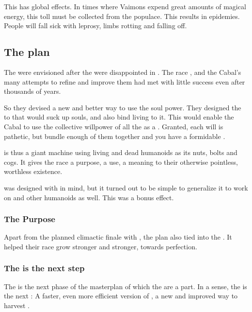 This has global effects. 
In times where Vaimons expend great amounts of magical energy, this toll must be collected from the populace. 
This results in epidemies. 
People will fall sick with leprosy, limbs rotting and falling off. 









\subsection{The \Iquin plan}
The \sephiroth{} were envisioned after the  were disappointed in \humans. 
The \human{} race , and the Cabal's many attempts to refine and improve them had met with little success even after thousands of years. 

So they devised a new and better way to use the \pps{\humans} soul power. 
They designed the \sephiroth{} to  that would suck up \human{} souls, and also bind living \humans{} to it. 
This would enable the Cabal to use the collective willpower of all the \humans{} as a \vertex. 
Granted, each \human{} will is pathetic, but bundle enough of them together and you have a formidable \vertex. 

\Iquin{} is thus a giant machine using living and dead humanoids as its nuts, bolts and cogs. 
It gives the \human{} race a purpose, a use, a meaning to their otherwise pointless, worthless existence. 

\Iquin{} was designed with \humans{} in mind, but it turned out to be simple to generalize it to work on \scathae{} and other humanoids as well. 
This was a bonus effect. 





\subsubsection{The \Resphan{} Purpose}
Apart from the planned climactic finale with , the \iquin{} plan also tied into the . 
It helped their race grow stronger and stronger, towards perfection. 





\subsubsection{The \Morbus is the next step}
The  is the next phase of the masterplan of which the \sephiroth{} are a part. 
In a sense, the \Morbus{} is the next : 
A faster, even more efficient version of \iquin, a new and improved way to harvest \humans{}. 

